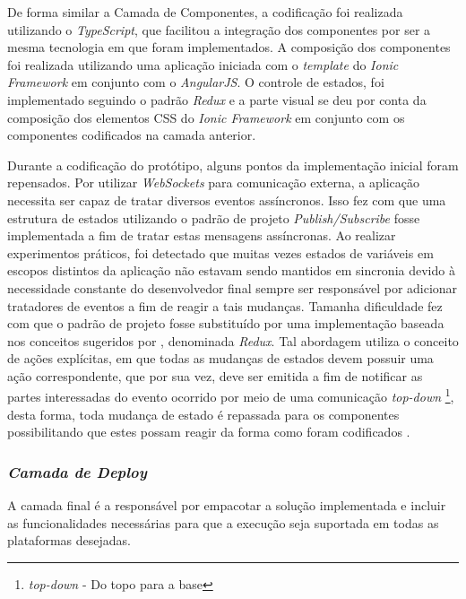 De forma similar a Camada de Componentes, a codificação foi realizada utilizando o \textit{TypeScript}, que facilitou a integração dos componentes por ser a mesma tecnologia em que foram implementados. A composição dos componentes foi realizada utilizando uma aplicação iniciada com o \textit{template} do \textit{Ionic Framework} em conjunto com o \textit{AngularJS}. O controle de estados, foi implementado seguindo o padrão \textit{Redux} e a parte visual se deu por conta da composição dos elementos CSS do \textit{Ionic Framework} em conjunto com os componentes codificados na camada anterior.

Durante a codificação do protótipo, alguns pontos da implementação inicial foram repensados. Por utilizar \textit{WebSockets} para comunicação externa, a aplicação necessita ser capaz de tratar diversos eventos assíncronos. Isso fez com que uma estrutura de estados utilizando o padrão de projeto \textit{Publish/Subscribe} fosse implementada a fim de tratar estas mensagens assíncronas. Ao realizar experimentos práticos, foi detectado que muitas vezes estados de variáveis em escopos distintos da aplicação não estavam sendo mantidos em sincronia devido à necessidade constante do desenvolvedor final sempre ser responsável por adicionar tratadores de eventos a fim de reagir a tais mudanças. 
Tamanha dificuldade fez com que o padrão de projeto fosse substituído por uma implementação baseada nos conceitos sugeridos por \cite{redux}, denominada \textit{Redux}. Tal abordagem utiliza o conceito de ações explícitas, em que todas as mudanças de estados devem possuir uma ação correspondente, que por sua vez, deve ser emitida a fim de notificar as partes interessadas do evento ocorrido por meio de uma comunicação \textit{top-down} \footnote[1]{\textit{top-down} - Do topo para a base}, desta forma, toda mudança de estado é repassada para os componentes possibilitando que estes possam reagir da forma como foram codificados \cite{redux}.


\subsubsection{{\it Camada de Deploy}}
A camada final é a responsável por empacotar a solução implementada e incluir as funcionalidades necessárias para que a execução seja suportada em todas as plataformas desejadas. 



